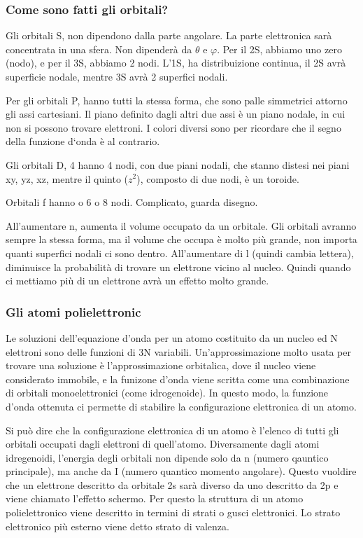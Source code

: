 \documentclass[a4paper]{article}
\begin{document}
\subsubsection{Come sono fatti gli orbitali?}
Gli orbitali S, non dipendono dalla parte angolare. La parte elettronica sarà concentrata in una sfera. Non dipenderà da $\theta$ e $\varphi$. Per il 2S, abbiamo uno zero (nodo), e per il 3S, abbiamo 2 nodi. L'1S, ha distribuizione continua, il 2S avrà superficie nodale, mentre 3S avrà 2 superfici nodali. 

Per gli orbitali P, hanno tutti la stessa forma, che sono palle simmetrici attorno gli assi cartesiani. Il piano definito dagli altri due assi è un piano nodale, in cui non si possono trovare elettroni. I colori diversi sono per ricordare che il segno della funzione d`onda è al contrario.

Gli orbitali D, 4 hanno 4 nodi, con due piani nodali, che stanno distesi nei piani xy, yz, xz, mentre il quinto ($z^2$), composto di due nodi, è un toroide. 

Orbitali f hanno o 6 o 8 nodi. Complicato, guarda disegno. 

All'aumentare n, aumenta il volume occupato da un orbitale. Gli orbitali avranno sempre la stessa forma, ma il volume che occupa è molto più grande, non importa quanti superfici nodali ci sono dentro. All'aumentare di l (quindi cambia lettera), diminuisce la probabilità di trovare un elettrone vicino al nucleo. Quindi quando ci mettiamo più di un elettrone avrà un effetto molto grande. 

\subsubsection{Gli atomi polielettronic}
Le soluzioni dell'equazione d'onda per un atomo costituito da un nucleo ed N elettroni sono delle funzioni di 3N variabili. Un'approssimazione molto usata per trovare una soluzione è l'approssimazione orbitalica, dove il nucleo viene considerato immobile, e la funizone d'onda viene scritta come una combinazione di orbitali monoelettronici (come idrogenoide). In questo modo, la funzione d'onda ottenuta ci permette di stabilire la configurazione elettronica di un atomo. 

Si può dire che la configurazione elettronica di un atomo è l'elenco di tutti gli orbitali occupati dagli elettroni di quell'atomo. Diversamente dagli atomi idregenoidi, l'energia degli orbitali non dipende solo da n (numero qauntico principale), ma anche da I (numero quantico momento angolare). Questo vuoldire che un elettrone descritto da orbitale 2s sarà diverso da uno descritto da 2p e viene chiamato l'effetto schermo. Per questo la struttura di un atomo polielettronico viene descritto in termini di strati o gusci elettronici. Lo strato elettronico più esterno viene detto strato di valenza. 
\end{document}
